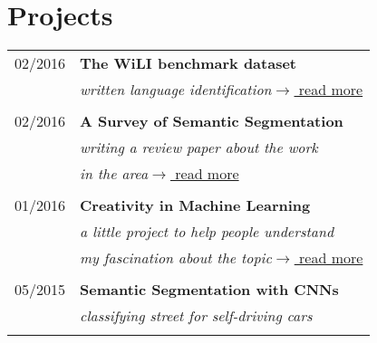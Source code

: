 \documentclass[a4paper,10pt]{article} %
\begin{document}
{\begin{minipage}[t]{0.5\textwidth}
\end{minipage} %
\hfill
\begin{minipage}[t]{0.44\textwidth}
\vspace{0pt} %


\section{Projects}

\begin{tabular}{rl}
02/2016  & \textbf{The WiLI benchmark dataset}\\
& \textit{written language identification}\hfill \href{https://arxiv.org/abs/1801.07779}{$\rightarrow$ read more}\\ \\

02/2016  & \textbf{A Survey of Semantic Segmentation}\\
& \textit{writing a review paper about the work }\\
& \textit{in the area}\hfill \href{https://arxiv.org/abs/1602.06541}{$\rightarrow$ read more}\\ \\

01/2016  & \textbf{Creativity in Machine Learning}\\
& \textit{a little project to help people understand}\\
& \textit{my fascination about the topic}\hfill \href{https://arxiv.org/abs/1601.03642}{$\rightarrow$ read more}\\ \\

05/2015  & \textbf{Semantic Segmentation with CNNs}\\
& \textit{classifying street for self-driving cars}\\ \\


\end{tabular}
\end{minipage}}
\end{document}
